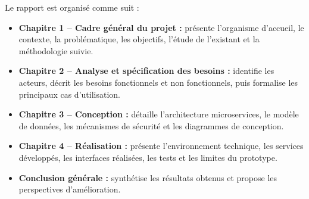 Le rapport est organisé comme suit :

\begin{itemize}
    \item \textbf{Chapitre 1 -- Cadre général du projet :} présente l'organisme d'accueil, le contexte, la problématique, les objectifs, l'étude de l'existant et la méthodologie suivie.
    \item \textbf{Chapitre 2 -- Analyse et spécification des besoins :} identifie les acteurs, décrit les besoins fonctionnels et non fonctionnels, puis formalise les principaux cas d'utilisation.
    \item \textbf{Chapitre 3 -- Conception :} détaille l'architecture microservices, le modèle de données, les mécanismes de sécurité et les diagrammes de conception.
    \item \textbf{Chapitre 4 -- Réalisation :} présente l'environnement technique, les services développés, les interfaces réalisées, les tests et les limites du prototype.
    \item \textbf{Conclusion générale :} synthétise les résultats obtenus et propose les perspectives d'amélioration.
\end{itemize}

